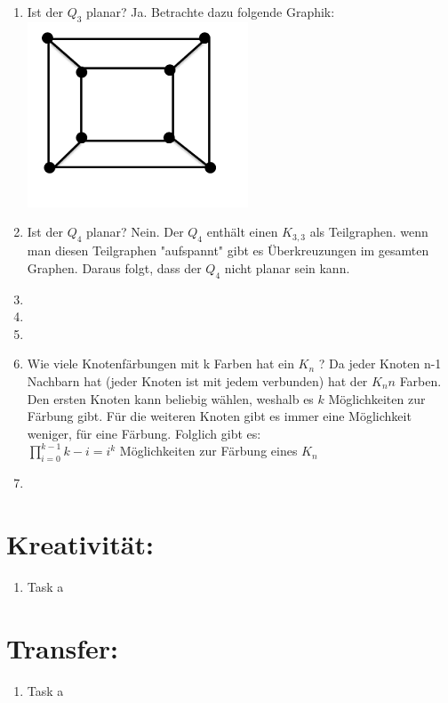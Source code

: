 \begin{enumerate}[label=(\alph*)]
        \item Ist der $Q_3$ planar? 
        Ja. Betrachte dazu folgende Graphik:\\
        \includegraphics{Q3}
        
        \item Ist der $Q_4$ planar?
        Nein. Der $Q_4$ enthält einen $K_{3,3}$ als Teilgraphen. wenn man diesen Teilgraphen "aufspannt" gibt es Überkreuzungen im gesamten Graphen. Daraus folgt, dass der $Q_4$ nicht planar sein kann.
        \item
        
        \item
        
        \item
        \item Wie viele Knotenfärbungen mit k Farben hat ein $K_n$ ?
        Da jeder Knoten n-1 Nachbarn hat (jeder Knoten ist mit jedem verbunden) hat der $K_n n$ Farben. Den ersten Knoten kann beliebig wählen, weshalb es $k$ Möglichkeiten zur Färbung gibt. Für die weiteren Knoten gibt es immer eine Möglichkeit weniger, für eine Färbung. Folglich gibt es: \\
        $\prod_{i=0}^{k-1} k - i = i^k $ Möglichkeiten zur Färbung eines $K_n$
          
        \item
        
    \end{enumerate}
    \section*{Kreativität:}
    \begin{enumerate}[label=(\alph*)]
    	\item Task a
    \end{enumerate}
    \section*{Transfer:}
    \begin{enumerate}[label=(\alph*)]
    	\item Task a
    \end{enumerate}







